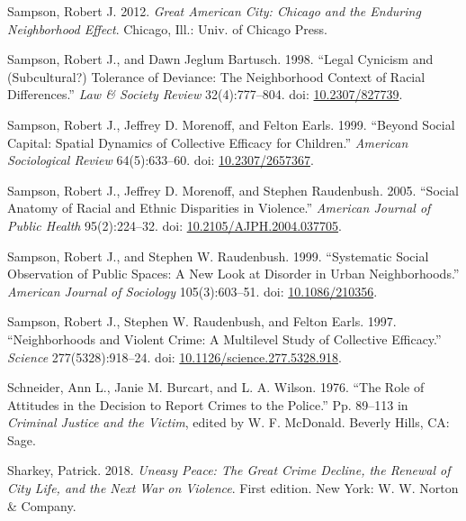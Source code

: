 \documentclass [11pt, proquest] {uwthesis}[2015/03/03]
\newlength{\cslhangindent}
\newenvironment{CSLReferences}[2]%
{\setlength{\parindent}{0pt}%
\everypar{\setlength{\hangindent}{\cslhangindent}}\ignorespaces}%
{\par}
\begin{document}
\begin{CSLReferences}{1}{0}
\leavevmode\hypertarget{ref-sampsonGreatAmericanCity2012}{}%
Sampson, Robert J. 2012. \emph{Great {American City}: {Chicago} and the {Enduring Neighborhood Effect}}. {Chicago, Ill.}: {Univ. of Chicago Press}.

\leavevmode\hypertarget{ref-sampsonLegalCynicismSubcultural1998}{}%
Sampson, Robert J., and Dawn Jeglum Bartusch. 1998. {``Legal {Cynicism} and ({Subcultural}?) {Tolerance} of {Deviance}: {The Neighborhood Context} of {Racial Differences}.''} \emph{Law \& Society Review} 32(4):777--804. doi: \href{https://doi.org/10.2307/827739}{10.2307/827739}.

\leavevmode\hypertarget{ref-sampsonSocialCapitalSpatial1999}{}%
Sampson, Robert J., Jeffrey D. Morenoff, and Felton Earls. 1999. {``Beyond {Social Capital}: {Spatial Dynamics} of {Collective Efficacy} for {Children}.''} \emph{American Sociological Review} 64(5):633--60. doi: \href{https://doi.org/10.2307/2657367}{10.2307/2657367}.

\leavevmode\hypertarget{ref-sampsonSocialAnatomyRacial2005}{}%
Sampson, Robert J., Jeffrey D. Morenoff, and Stephen Raudenbush. 2005. {``Social {Anatomy} of {Racial} and {Ethnic Disparities} in {Violence}.''} \emph{American Journal of Public Health} 95(2):224--32. doi: \href{https://doi.org/10.2105/AJPH.2004.037705}{10.2105/AJPH.2004.037705}.

\leavevmode\hypertarget{ref-sampsonSystematicSocialObservation1999}{}%
Sampson, Robert J., and Stephen W. Raudenbush. 1999. {``Systematic {Social Observation} of {Public Spaces}: {A New Look} at {Disorder} in {Urban Neighborhoods}.''} \emph{American Journal of Sociology} 105(3):603--51. doi: \href{https://doi.org/10.1086/210356}{10.1086/210356}.

\leavevmode\hypertarget{ref-sampsonNeighborhoodsViolentCrime1997a}{}%
Sampson, Robert J., Stephen W. Raudenbush, and Felton Earls. 1997. {``Neighborhoods and {Violent Crime}: {A Multilevel Study} of {Collective Efficacy}.''} \emph{Science} 277(5328):918--24. doi: \href{https://doi.org/10.1126/science.277.5328.918}{10.1126/science.277.5328.918}.

\leavevmode\hypertarget{ref-schneiderRoleAttitudesDecision1976}{}%
Schneider, Ann L., Janie M. Burcart, and L. A. Wilson. 1976. {``The {Role} of {Attitudes} in the {Decision} to {Report Crimes} to the {Police}.''} Pp. 89--113 in \emph{Criminal {Justice} and the {Victim}}, edited by W. F. McDonald. {Beverly Hills, CA}: {Sage}.

\leavevmode\hypertarget{ref-sharkeyUneasyPeaceGreat2018}{}%
Sharkey, Patrick. 2018. \emph{Uneasy Peace: The Great Crime Decline, the Renewal of City Life, and the Next War on Violence}. First edition. {New York}: {W. W. Norton \& Company}.


\end{CSLReferences}
\end{document}
